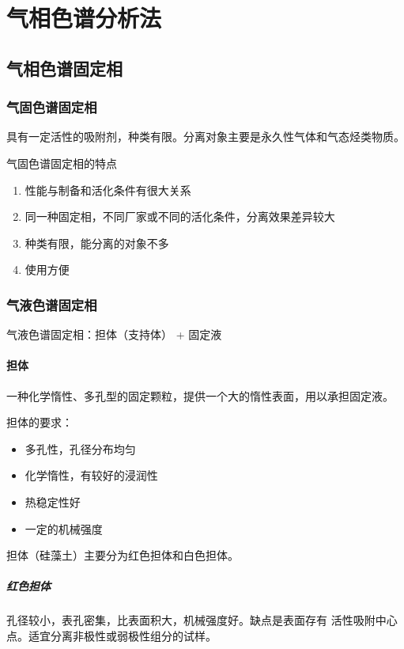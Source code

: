 \chapter{气相色谱分析法}

\section{气相色谱固定相}

\subsection{气固色谱固定相}

具有一定活性的吸附剂，种类有限。分离对象主要是永久性气体和气态烃类物质。

气固色谱固定相的特点

\begin{enumerate}
    \item 性能与制备和活化条件有很大关系
    \item 同一种固定相，不同厂家或不同的活化条件，分离效果差异较大
    \item 种类有限，能分离的对象不多
    \item 使用方便
\end{enumerate}

\subsection{气液色谱固定相}

气液色谱固定相：担体（支持体） + 固定液

\subsubsection{担体}

一种化学惰性、多孔型的固定颗粒，提供一个大的惰性表面，用以承担固定液。

担体的要求：

\begin{itemize}
    \item 多孔性，孔径分布均匀
    \item 化学惰性，有较好的浸润性
    \item 热稳定性好
    \item 一定的机械强度
\end{itemize}

担体（硅藻土）主要分为红色担体和白色担体。

\paragraph{红色担体} 孔径较小，表孔密集，比表面积大，机械强度好。缺点是表面存有
活性吸附中心点。适宜分离非极性或弱极性组分的试样。

